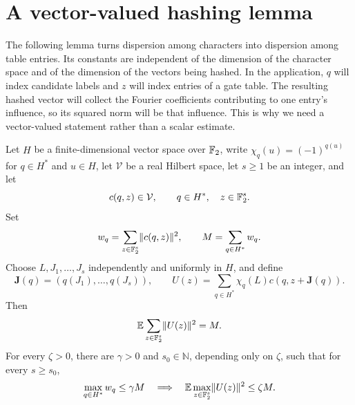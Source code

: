 \section{A vector-valued hashing lemma}\label{sec:hashing}

The following lemma turns dispersion among characters into dispersion among
table entries.  Its constants are independent of the dimension of the character
space and of the dimension of the vectors being hashed. In the application,
$q$ will index candidate labels and $z$ will index entries of a gate table.
The resulting hashed vector will collect the Fourier coefficients
contributing to one entry's influence, so its squared norm will be that influence. This is why
we need a vector-valued statement rather than a scalar estimate.

\begin{lemma}\label{lem:hashing}
Let $H$ be a finite-dimensional vector space over $\mathbb F_2$, write
$\chi_q(u)=(-1)^{q(u)}$ for $q\in H^*$ and $u\in H$, let $\mathcal V$ be a
real Hilbert space, let $s\ge1$ be an integer, and let
\[
 c(q,z)\in\mathcal V,
 \qquad q\in H^*,\quad z\in\mathbb F_2^s.
\]
Set
\[
 w_q=\sum_{z\in\mathbb F_2^s}\lVert c(q,z)\rVert^2,
 \qquad M=\sum_{q\in H^*}w_q.
\]
Choose $L,J_1,\ldots,J_s$ independently and uniformly in $H$, and define
\[
 \mathbf J(q)=(q(J_1),\ldots,q(J_s)),
 \qquad
 U(z)=\sum_{q\in H^*}\chi_q(L)c(q,z+\mathbf J(q)).
\]
Then
\begin{equation}\label{eq:hashing-total-mass}
 \mathbb E\sum_{z\in\mathbb F_2^s}\lVert U(z)\rVert^2=M.
\end{equation}
For every $\zeta>0$, there are $\gamma>0$ and $s_0\in\mathbb N$, depending
only on $\zeta$, such that for every $s\ge s_0$,
\begin{equation}\label{eq:hashing-dispersion}
 \max_{q\in H^*}w_q\le\gamma M
 \quad\Longrightarrow\quad
 \mathbb E\max_{z\in\mathbb F_2^s}\lVert U(z)\rVert^2\le\zeta M.
\end{equation}
\end{lemma}

